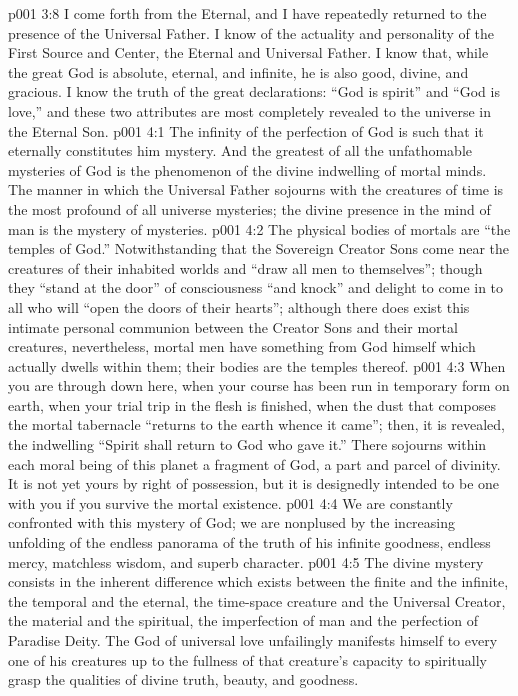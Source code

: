 \vs p001 3:8 I come forth from the Eternal, and I have repeatedly returned to the presence of the Universal Father. I know of the actuality and personality of the First Source and Center, the Eternal and Universal Father. I know that, while the great God is absolute, eternal, and infinite, he is also good, divine, and gracious. I know the truth of the great declarations: “God is spirit” and “God is love,” and these two attributes are most completely revealed to the universe in the Eternal Son.
\vs p001 4:1 The infinity of the perfection of God is such that it eternally constitutes him mystery. And the greatest of all the unfathomable mysteries of God is the phenomenon of the divine indwelling of mortal minds. The manner in which the Universal Father sojourns with the creatures of time is the most profound of all universe mysteries; the divine presence in the mind of man is the mystery of mysteries.
\vs p001 4:2 The physical bodies of mortals are “the temples of God.” Notwithstanding that the Sovereign Creator Sons come near the creatures of their inhabited worlds and “draw all men to themselves”; though they “stand at the door” of consciousness “and knock” and delight to come in to all who will “open the doors of their hearts”; although there does exist this intimate personal communion between the Creator Sons and their mortal creatures, nevertheless, mortal men have something from God himself which actually dwells within them; their bodies are the temples thereof.
\vs p001 4:3 When you are through down here, when your course has been run in temporary form on earth, when your trial trip in the flesh is finished, when the dust that composes the mortal tabernacle “returns to the earth whence it came”; then, it is revealed, the indwelling “Spirit shall return to God who gave it.” There sojourns within each moral being of this planet a fragment of God, a part and parcel of divinity. It is not yet yours by right of possession, but it is designedly intended to be one with you if you survive the mortal existence.
\vs p001 4:4 \pc We are constantly confronted with this mystery of God; we are nonplused by the increasing unfolding of the endless panorama of the truth of his infinite goodness, endless mercy, matchless wisdom, and superb character.
\vs p001 4:5 \pc The divine mystery consists in the inherent difference which exists between the finite and the infinite, the temporal and the eternal, the time\hyp{}space creature and the Universal Creator, the material and the spiritual, the imperfection of man and the perfection of Paradise Deity. The God of universal love unfailingly manifests himself to every one of his creatures up to the fullness of that creature’s capacity to spiritually grasp the qualities of divine truth, beauty, and goodness.
